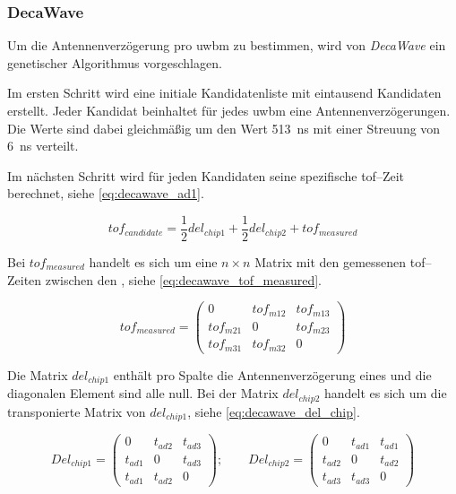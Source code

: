 \begin{comment}
--------------------------------------------------------------------------------
\end{comment}
\subsubsection{DecaWave}

Um die Antennenverzögerung pro \Gls{uwbm} zu bestimmen, wird von \textit{DecaWave} ein genetischer Algorithmus vorgeschlagen. \cite{decawave2014calibration}

Im ersten Schritt wird eine initiale Kandidatenliste mit eintausend Kandidaten erstellt. Jeder Kandidat beinhaltet für jedes \Gls{uwbm} eine Antennenverzögerungen. Die Werte sind dabei gleichmäßig um den Wert \SI{513}{\ns} mit einer Streuung von \SI{6}{\ns} verteilt.

Im nächsten Schritt wird für jeden Kandidaten seine spezifische \Gls{tof}--Zeit berechnet, siehe \autoref{eq:decawave_ad1}.

\begin{equation}
tof_{candidate}=\frac12 del_{chip1} + \frac12 del_{chip2} + tof_{measured}\label{eq:decawave_ad1}
\end{equation}

Bei $tof_{measured}$ handelt es sich um eine $n \times n$ Matrix mit den gemessenen \Gls{tof}--Zeiten zwischen den , siehe \autoref{eq:decawave_tof_measured}.

\begin{equation}
tof_{measured} = \begin{pmatrix}0 & tof_{m12} & tof_{m13} \\ tof_{m21} & 0 & tof_{m23} \\ tof_{m31} & tof_{m32} & 0 \end{pmatrix} \label{eq:decawave_tof_measured}
\end{equation}

Die Matrix $del_{chip1}$ enthält pro Spalte die Antennenverzögerung eines  und die diagonalen Element sind alle null. Bei der Matrix $del_{chip2}$ handelt es sich um die transponierte Matrix von $del_{chip1}$, siehe \autoref{eq:decawave_del_chip}.

\begin{equation}
Del_{chip1} = \begin{pmatrix}0 & t_{ad2} & t_{ad3} \\ t_{ad1} & 0 & t_{ad3} \\ t_{ad1} & t_{ad2} & 0 \end{pmatrix}; \qquad Del_{chip2} = \begin{pmatrix}0 & t_{ad1} & t_{ad1} \\ t_{ad2} & 0 & t_{ad2} \\ t_{ad3} & t_{ad3} & 0 \end{pmatrix} \label{eq:decawave_del_chip}
\end{equation}

